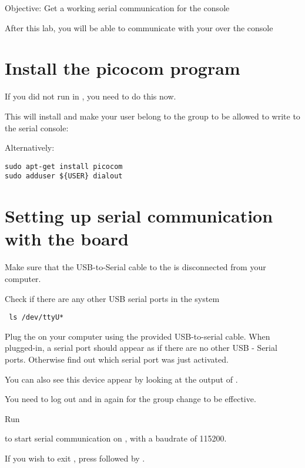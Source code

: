 {Objective: Get a working serial communication for the console}

After this lab, you will be able to communicate with your \devboard over the console

\section{Install the picocom program}

If you did not run  in \labdir, you need to do this now.

This will install  and make your user belong to the  
group to be allowed to write to the serial console:

Alternatively:

\begin{verbatim}
sudo apt-get install picocom
sudo adduser ${USER} dialout
\end{verbatim}

\section{Setting up serial communication with the board}

Make sure that the USB-to-Serial cable to the \devboard is disconnected from your computer.

Check if there are any other USB serial ports in the system

{\small
{\tt
ls /dev/ttyU*
}
}

Plug the \devboard on your computer using the provided
USB-to-serial cable. When plugged-in, a serial port should appear as
 if there are no other USB - Serial ports.
Otherwise find out which serial port was just activated.

You can also see this device appear by looking at the output of
.


You need to log out and in again for the group change to be effective.

Run 


to start serial communication on , with a baudrate of 115200.

If you wish to exit , press \code{[Ctrl][a]} followed by
\code{[Ctrl][x]}.

